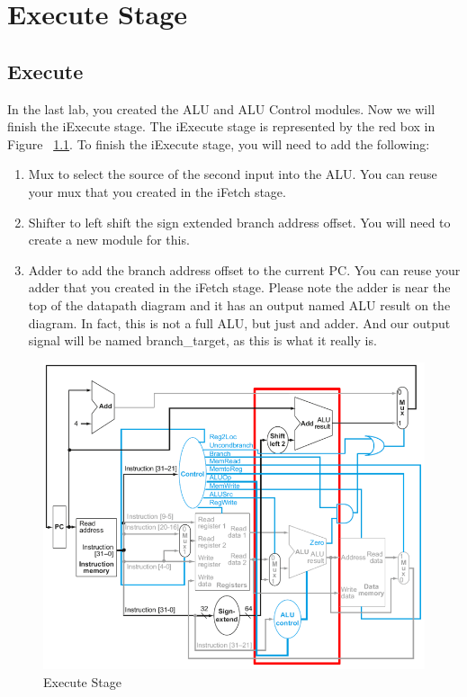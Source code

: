 \chapter{Execute Stage}

\section{Execute}

In the last lab, you created the ALU and ALU Control modules.  Now we will finish the iExecute stage.  The iExecute stage is represented by the red box in Figure ~\ref{fig:execute_stage}.  To finish the iExecute stage, you will need to add the following:
 
\begin{enumerate}
	\item Mux to select the source of the second input into the ALU.  You can reuse your mux that you created in the iFetch stage.
	\item Shifter to left shift the sign extended branch address offset.  You will need to create a new module for this.
	\item Adder to add the branch address offset to the current PC.  You can reuse your adder that you created in the iFetch stage.  Please note the adder is near the top of the datapath diagram and it has an output named ALU result on the diagram.  In fact, this is not a full ALU, but just and adder.  And our output signal will be named branch\_target, as this is what it really is.
\end{enumerate} 

\begin{figure}
	\caption{Execute Stage}\label{fig:execute_stage}
	\begin{center}
		\includegraphics[width=4.75in]{../images/execute_stage.png}
	\end{center}
\end{figure} 

